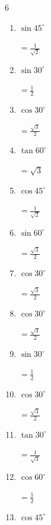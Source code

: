 \begin{multicols}{6}
\begin{enumerate}
        $\displaystyle =\frac{\sqrt{3}}{2}$

  \item $\displaystyle \sin{45^\circ}$

        $\displaystyle =\frac{1}{\sqrt{2}}$

  \item $\displaystyle \sin{30^\circ}$

        $\displaystyle =\frac{1}{2}$

  \item $\displaystyle \cos{30^\circ}$

        $\displaystyle =\frac{\sqrt{3}}{2}$

  \item $\displaystyle \tan{60^\circ}$

        $\displaystyle =\sqrt{3}$

  \item $\displaystyle \cos{45^\circ}$

        $\displaystyle =\frac{1}{\sqrt{2}}$

  \item $\displaystyle \sin{60^\circ}$

        $\displaystyle =\frac{\sqrt{3}}{2}$

  \item $\displaystyle \cos{30^\circ}$

        $\displaystyle =\frac{\sqrt{3}}{2}$

  \item $\displaystyle \cos{30^\circ}$

        $\displaystyle =\frac{\sqrt{3}}{2}$

  \item $\displaystyle \sin{30^\circ}$

        $\displaystyle =\frac{1}{2}$

  \item $\displaystyle \cos{30^\circ}$

        $\displaystyle =\frac{\sqrt{3}}{2}$

  \item $\displaystyle \tan{30^\circ}$

        $\displaystyle =\frac{1}{\sqrt{3}}$

  \item $\displaystyle \cos{60^\circ}$

        $\displaystyle =\frac{1}{2}$

  \item $\displaystyle \cos{45^\circ}$


\end{enumerate}
\end{multicols}
